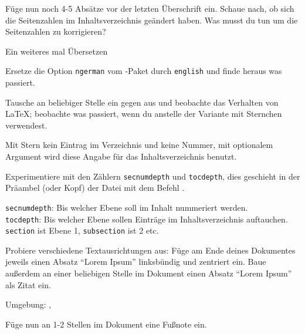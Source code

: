 \begin{uebung}
\item Füge nun noch 4-5 Absätze vor der letzten Überschrift ein.
    Schaue nach, ob sich die Seitenzahlen im Inhaltsverzeichnis geändert haben.
    Was musst du tun um die Seitenzahlen zu korrigieren?
    \begin{loesung}
        Ein weiteres mal Übersetzen
    \end{loesung}

\item Ersetze die Option \texttt{ngerman} vom -Paket durch
	\texttt{english} und finde heraus was passiert.

\item Tausche an beliebiger Stelle ein  gegen 
	 aus und beobachte das Verhalten von \LaTeX; 
	beobachte was passiert, wenn du  
	anstelle der Variante mit Sternchen verwendest.
	\label{aufg:sectionstar}
	\begin{loesung}
	    Mit Stern kein Eintrag im Verzeichnis und keine Nummer, mit optionalem
	    Argument wird diese Angabe für das Inhaltsverzeichnis benutzt.
	\end{loesung}

\item Experimentiere mit den Zählern \texttt{secnumdepth} und 
	\texttt{tocdepth}, dies geschieht in der Präambel (oder Kopf) der Datei mit dem
	Befehl . \label{zaehler}
	\begin{loesung}
	    \texttt{secnumdepth}: Bis welcher Ebene soll im Inhalt nummeriert werden.\\ 
	    \texttt{tocdepth}: Bis welcher Ebene sollen Einträge im Inhaltsverzeichnis auftauchen.\\
	    \texttt{section} ist Ebene 1, \texttt{subsection} ist 2 etc.
	\end{loesung}

\item Probiere verschiedene Textausrichtungen aus: Füge am Ende
    deines Dokumentes jeweils einen Absatz \enquote{Lorem Ipsum}
    linksbündig und zentriert ein. Baue außerdem an einer beliebigen Stelle
    im Dokument einen Absatz \enquote{Lorem Ipsum} als Zitat ein.
    \begin{loesung}
        Umgebung: , 
    \end{loesung}

\item Füge nun an 1-2 Stellen im Dokument eine Fußnote ein.


\end{uebung}
